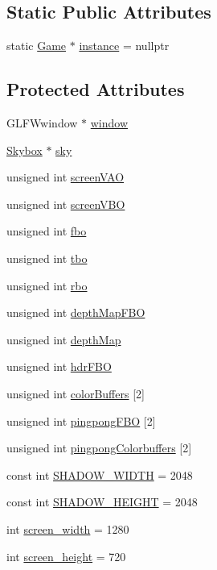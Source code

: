 \subsection*{Static Public Attributes}
\begin{DoxyCompactItemize}
\item 
static \mbox{\hyperlink{class_game}{Game}} $\ast$ \mbox{\hyperlink{class_game_aa469cdc0a30f4fd2d6d99b23f4fbf257}{instance}} = nullptr
\end{DoxyCompactItemize}
\subsection*{Protected Attributes}
\begin{DoxyCompactItemize}
\item 
G\+L\+F\+Wwindow $\ast$ \mbox{\hyperlink{class_game_ad9bc7cf39168a1ceaf77d6177116aa94}{window}}
\item 
\mbox{\hyperlink{class_skybox}{Skybox}} $\ast$ \mbox{\hyperlink{class_game_a46b9b13579445bc071f6cba24953b531}{sky}}
\item 
unsigned int \mbox{\hyperlink{class_game_a92aabad09ef89df6964b62b89c2f7edb}{screen\+V\+AO}}
\item 
unsigned int \mbox{\hyperlink{class_game_a64dfde0688161bc1d584fc448c496e49}{screen\+V\+BO}}
\item 
unsigned int \mbox{\hyperlink{class_game_a64cdbfe0d81d60426bb6523459d7b52c}{fbo}}
\item 
unsigned int \mbox{\hyperlink{class_game_af04f4198d017854557726ab48726e709}{tbo}}
\item 
unsigned int \mbox{\hyperlink{class_game_a521e6ba079b5beb2d552137f9363e36e}{rbo}}
\item 
unsigned int \mbox{\hyperlink{class_game_aab4586c4a7c0240977381b22808ebfa6}{depth\+Map\+F\+BO}}
\item 
unsigned int \mbox{\hyperlink{class_game_a61853261d678bcfe2638deba1e58fd18}{depth\+Map}}
\item 
unsigned int \mbox{\hyperlink{class_game_aecf2b0705e36b7b510be741add10f974}{hdr\+F\+BO}}
\item 
unsigned int \mbox{\hyperlink{class_game_af6b4374237efc5ae2586dd1b2a0304f3}{color\+Buffers}} \mbox{[}2\mbox{]}
\item 
unsigned int \mbox{\hyperlink{class_game_a0160418629f882b089847e9ddd6901f5}{pingpong\+F\+BO}} \mbox{[}2\mbox{]}
\item 
unsigned int \mbox{\hyperlink{class_game_abbb66ef5bda6124f03272970cd18707f}{pingpong\+Colorbuffers}} \mbox{[}2\mbox{]}
\item 
const int \mbox{\hyperlink{class_game_abf4d8e38c95fc6e1351e6dd85a19429f}{S\+H\+A\+D\+O\+W\+\_\+\+W\+I\+D\+TH}} = 2048
\item 
const int \mbox{\hyperlink{class_game_a6ff4bf491706f3c85c1de2ed7983a51b}{S\+H\+A\+D\+O\+W\+\_\+\+H\+E\+I\+G\+HT}} = 2048
\item 
int \mbox{\hyperlink{class_game_ac05df6adfb712932bac2afea1fb01dc3}{screen\+\_\+width}} = 1280
\item 
int \mbox{\hyperlink{class_game_ab52e2343e6335e426a6395c44f4dab71}{screen\+\_\+height}} = 720
\end{DoxyCompactItemize}


